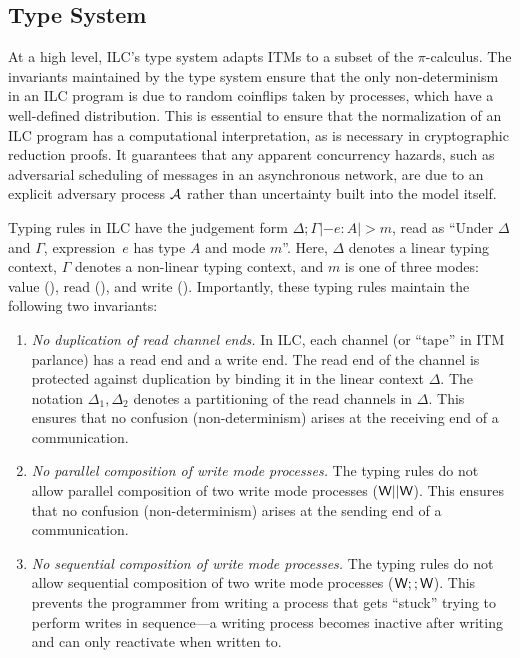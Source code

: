 

\subsection{Type System}
\label{subsec:types}







At a high level, ILC's type system adapts ITMs to a subset of the $\pi$-calculus.
The invariants maintained by the type system ensure that the only
non-determinism in an ILC program is due to random coinflips taken by processes,
which have a well-defined distribution. This is essential to ensure that the
normalization of an ILC program has a computational interpretation, as is
necessary in cryptographic reduction proofs. It guarantees that any apparent
concurrency hazards, such as adversarial scheduling of messages in an
asynchronous network, are due to an explicit adversary process $\mathcal{{A}}$ rather
than uncertainty built into the model itself.

Typing rules in ILC have the judgement form $\Delta ; \Gamma |- e : A |> m$, read as
``Under $\Delta$ and $\Gamma$, expression~$e$ has type $A$ and mode $m$''.  Here, $\Delta$
denotes a linear typing context, $\Gamma$ denotes a non-linear typing context, and
$m$ is one of three modes: value (\Vm), read (\Rm), and write
(\Wm). Importantly, these typing rules maintain the following two invariants:

\begin{enumerate}
\item \emph{No duplication of read channel ends.} In ILC, each channel (or
  ``tape'' in ITM parlance) has a read end and a write end. The read end of the
  channel is protected against duplication by binding it in the linear
  context $\Delta$. The notation $\Delta_1, \Delta_2$ denotes a partitioning of the read
  channels in $\Delta$. This ensures that no confusion (non-determinism) arises at the receiving end of
  a communication.

\item \emph{No parallel composition of write mode processes.} The typing rules
  do not allow parallel composition of two write mode processes ($\textsf{W} ||
  \textsf{W}$). This ensures that no confusion (non-determinism) arises at the sending
  end of a communication.

\item \emph{No sequential composition of write mode processes.} The typing rules
  do not allow sequential composition of two write mode processes ($\textsf{W} ;;
  \textsf{W}$). This prevents the programmer from writing a process that gets ``stuck''
  trying to perform writes in sequence---a writing process becomes inactive after
  writing and can only reactivate when written to.
\end{enumerate}

